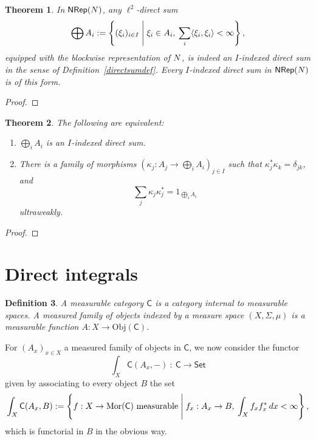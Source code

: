 \documentclass[reqno,T1]{amsproc}
\newcommand{\cat}[1]{\mathsf{#1}}		%
\newcommand{\Set}{\mathsf{Set}}
\newcommand{\NRep}[1]{\mathsf{NRep}(#1)}	%
\theoremstyle{plain}
\newtheorem{thm}{Theorem}[section]
\newtheorem{defn}[thm]{Definition}
\theoremstyle{remark}
\numberwithin{equation}{section}
\begin{document}
\begin{thm}
In $\NRep{\alg}$, any $\ell^2$-direct sum
\[
	\bigoplus A_i := \left\{ (\xi_i)_{i\in I} \Biggm \vert \xi_i\in A_i,\: \sum_i \langle\xi_i,\xi_i\rangle < \infty \right\},
\]
equipped with the blockwise representation of $N$, is indeed an \emph{$I$-indexed direct sum} in the sense of Definition~\ref{directsumdef}. Every $I$-indexed direct sum in $\NRep{\alg}$ is of this form.
\end{thm}

\begin{proof}
\end{proof}

\begin{thm}
The following are equivalent:
\begin{enumerate}
\item $\bigoplus_i A_i$ is an $I$-indexed direct sum.
\item There is a family of morphisms $\left(\kappa_j : A_j \to \bigoplus_i A_i\right)_{j\in I}$ such that $\kappa_j^*\kappa_k = \delta_{jk}$, and
\[
	\sum_j \kappa_j \kappa_j^* = 1_{\bigoplus_i A_i}
\]
ultraweakly.
\end{enumerate}
\end{thm}

\begin{proof}
\end{proof}


\section{Direct integrals}

\newcommand{\Obj}[1]{\mathrm{Obj}(#1)}
\newcommand{\Mor}[1]{\mathrm{Mor}(#1)}

\begin{defn}
A \emph{measurable category} $\cat{C}$ is a category internal to measurable spaces. A \emph{measured family of objects} indexed by a measure space $(X,\Sigma,\mu)$ is a measurable function $A : X\to\Obj{\cat{C}}$.
\end{defn}

For $(A_x)_{x\in X}$ a measured family of objects in $\cat{C}$, we now consider the functor
\[
	\int_X \cat{C}(A_x,-) \: : \: \cat{C}\to\Set
\]
given by associating to every object $B$ the set
\[
	\int_X \cat{C}(A_x , B) := \left\{ f : X\to\Mor{\cat{C}} \textrm{ measurable} \Biggm\vert f_x : A_x\to B,\: \int_X f_x f_x^* \,dx < \infty \right\},
\]
which is functorial in $B$ in the obvious way.
\end{document}
